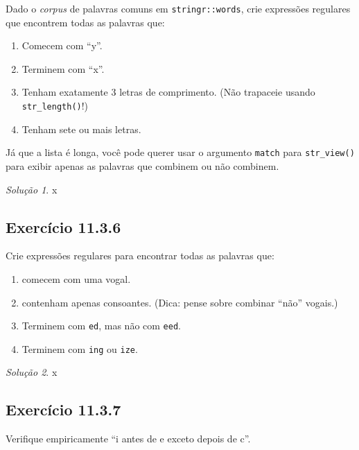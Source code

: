 \documentclass[
]{latex/krantz}
\providecommand{\tightlist}{%
  \setlength{\itemsep}{0pt}\setlength{\parskip}{0pt}}
\theoremstyle{definition}
\theoremstyle{definition}
\theoremstyle{definition}
\theoremstyle{definition}
\theoremstyle{remark}
\newtheorem*{solution}{Solução}
\begin{document}
Dado o \emph{corpus} de palavras comuns em \texttt{stringr::words}, crie expressões regulares que encontrem todas as palavras que:

\begin{enumerate}
\def\labelenumi{\alph{enumi}.}
\tightlist
\item
  Comecem com ``y''.
\item
  Terminem com ``x''.
\item
  Tenham exatamente 3 letras de comprimento. (Não trapaceie usando \texttt{str\_length()}!)
\item
  Tenham sete ou mais letras.
\end{enumerate}

Já que a lista é longa, você pode querer usar o argumento \texttt{match} para \texttt{str\_view()} para exibir apenas as palavras que combinem ou não combinem.

\begin{solution}
x
\end{solution}

\hypertarget{exr11-3-6}{%
\subsection*{Exercício 11.3.6}\label{exr11-3-6}}

Crie expressões regulares para encontrar todas as palavras que:

\begin{enumerate}
\def\labelenumi{\alph{enumi}.}
\tightlist
\item
  comecem com uma vogal.
\item
  contenham apenas consoantes. (Dica: pense sobre combinar ``não'' vogais.)
\item
  Terminem com \texttt{ed}, mas não com \texttt{eed}.
\item
  Terminem com \texttt{ing} ou \texttt{ize}.
\end{enumerate}

\begin{solution}
x
\end{solution}

\hypertarget{exr11-3-7}{%
\subsection*{Exercício 11.3.7}\label{exr11-3-7}}

Verifique empiricamente ``i antes de e exceto depois de c''.
\end{document}
